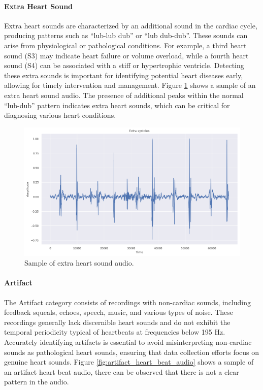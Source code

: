 \paragraph{Extra Heart Sound}
Extra heart sounds are characterized by an additional sound in the cardiac cycle, producing patterns such as ``lub-lub dub'' or ``lub dub-dub''.
These sounds can arise from physiological or pathological conditions. For example, a third heart sound (S3) may indicate heart failure or volume overload,
while a fourth heart sound (S4) can be associated with a stiff or hypertrophic ventricle.
Detecting these extra sounds is important for identifying potential heart diseases early, allowing for timely intervention and management.
Figure \ref{fig:extrahls_heart_beat_audio} shows a sample of an extra heart sound audio.
The presence of additional peaks within the normal ``lub-dub'' pattern indicates extra heart sounds, which can be
critical for diagnosing various heart conditions.

\begin{figure}[H]
    \centering
    \includegraphics[width=.8\columnwidth]{../images/extrastoles_heart_beat_audio.png}
    \caption{Sample of extra heart sound audio.}
    \label{fig:extrahls_heart_beat_audio}
\end{figure}

\paragraph{Artifact}
The Artifact category consists of recordings with non-cardiac sounds, including feedback squeals, echoes, speech, music, and various types of noise.
These recordings generally lack discernible heart sounds and do not exhibit the temporal periodicity typical of heartbeats at frequencies below 195 Hz.
Accurately identifying artifacts is essential to avoid misinterpreting non-cardiac sounds as pathological heart sounds,
ensuring that data collection efforts focus on genuine heart sounds.
Figure \ref{fig:artifact_heart_beat_audio} shows a sample of an artifact heart beat audio, there can be observed that there is not a clear pattern in the audio.

